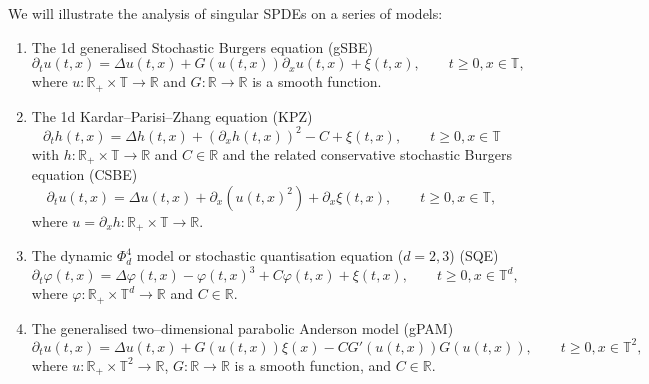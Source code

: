 \documentclass[a4paper, 11pt]{article}
\begin{document}
We will illustrate the analysis of singular SPDEs on a series of models:
\begin{enumerate}
  \item The 1d generalised Stochastic Burgers equation (gSBE)
  \begin{equation}
    \partial_t u (t, x) = \Delta u (t, x) + G (u (t, x)) \partial_x u (t, x) +
    \xi (t, x), \qquad t \geqslant 0, x \in \mathbb{T}, \label{eq:gSBE}
  \end{equation}
  where $u\colon \mathbb{R}_+ \times \mathbb{T} \rightarrow \mathbb{R}$ and
  $G : \mathbb{R} \rightarrow \mathbb{R}$ is a 
  smooth function.
  
  \item The 1d Kardar--Parisi--Zhang equation (KPZ)
  \begin{equation}
    \partial_t h (t, x) = \Delta h (t, x) + (\partial_x h (t, x))^2 - C + \xi
    (t, x), \qquad t \geqslant 0, x \in \mathbb{T} \label{eq:KPZ}
  \end{equation}
  with $h\colon \mathbb{R}_+ \times \mathbb{T} \rightarrow \mathbb{R}$ and $C
  \in \mathbb{R}$ and the related conservative stochastic Burgers equation
  (CSBE) 
  \begin{equation}
    \partial_t u (t, x) = \Delta u (t, x) + \partial_x (u (t, x)^2) +
    \partial_x \xi (t, x), \qquad t \geqslant 0, x \in \mathbb{T},
    \label{eq:CSBE}
  \end{equation}
  where $u = \partial_x h\colon \mathbb{R}_+ \times \mathbb{T} \rightarrow
  \mathbb{R}$.
  
  \item The dynamic $\Phi^4_d$ model or stochastic quantisation equation ($d =
  2, 3$) (SQE)
  \begin{equation}
    \partial_t \varphi (t, x) = \Delta \varphi (t, x) - \varphi (t, x)^3 + C \varphi (t, x) + \xi (t, x), \qquad t \geqslant 0,
    x \in \mathbb{T}^d, \label{eq:SQE}
  \end{equation}
  where $\varphi\colon \mathbb{R}_+ \times \mathbb{T}^d \rightarrow \mathbb{R}$
  and $C \in \mathbb{R}$.
  
  \item The generalised two--dimensional parabolic Anderson model (gPAM)
  \begin{equation}
    \partial_t u (t, x) = \Delta u (t, x) + G (u (t, x)) \xi (x) - C G' (u (t,
    x)) G (u (t, x)), \qquad t \geqslant 0, x \in \mathbb{T}^2,
    \label{eq:gPAM}
  \end{equation}
  where $u\colon \mathbb{R}_+ \times \mathbb{T}^2 \rightarrow \mathbb{R}$, $G :
  \mathbb{R} \rightarrow \mathbb{R}$ is a smooth function, and $C \in
  \mathbb{R}$.
\end{enumerate}
\end{document}
